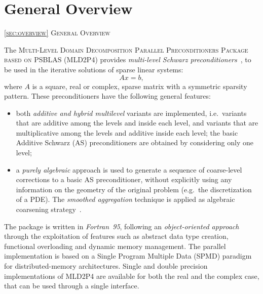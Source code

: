 \section{General Overview\label{sec:overview}}
         {\textsc{\ref{sec:overview} General Overview}}
            
The \textsc{Multi-Level Domain Decomposition Parallel Preconditioners Package based on
PSBLAS (MLD2P4}) provides \emph{multi-level Schwarz preconditioners}~\cite{dd2_96},
to be used in the iterative solutions of sparse linear systems:
\begin{equation} 
Ax=b, 
\label{system1}
\end{equation} 
where $A$ is a square, real or complex, sparse matrix with a symmetric sparsity pattern.
%
%
These preconditioners have the following general features:
\begin{itemize}
\item both \emph{additive and hybrid multilevel} variants are implemented,
i.e.\ variants that are additive among the levels and inside each level, and variants
that are multiplicative among the levels and additive inside each level;
the basic Additive Schwarz (AS) preconditioners are obtained by considering only one level;
\item a \emph{purely algebraic} approach is used to
generate a sequence of coarse-level corrections to a basic AS preconditioner, without
explicitly using any information on the geometry of the original problem (e.g.\ the
discretization of a PDE). The \emph{smoothed aggregation} technique is applied
as algebraic coarsening strategy~\cite{BREZINA_VANEK,VANEK_MANDEL_BREZINA}.
\end{itemize}

The package is written in \emph{Fortran~95}, following an
\emph{object-oriented approach} through the exploitation of features
such as abstract data type creation, functional 
overloading and dynamic memory management.
The parallel implementation is based
on a Single Program Multiple Data (SPMD) paradigm for distributed-memory architectures. 
Single and double precision implementations of MLD2P4 are available for both the
real and the complex case, that can be used through a single interface.


